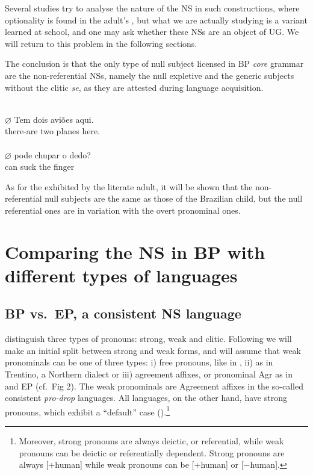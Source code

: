 \documentclass[output=paper]{langsci/langscibook}
\begin{document}
Several studies try to analyse the nature of the NS in such constructions,
where optionality is found in the adult’s , but what we are actually
studying is a variant learned at school, and one may ask whether these NSs are
an object of \gls{UG}. We will return to this problem in the following
sections.

The conclusion is that the only type of null subject licensed in
\gls{BP} \emph{core} grammar are the non-referential
NSs, namely the null expletive and the generic subjects without the clitic
\emph{se}, as they are attested during language acquisition.

\ea%
    \label{ex:26.16}
    \ea \textcite{Simoes2000}\\
    \gll    $\varnothing$\tss{\Expl} Tem dois aviões aqui.\\
            {} there-are two planes here.\\
    \ex \textcite{Magalhaes2007}\\
    \gll    $\varnothing$\tss{\Genc} pode chupar o dedo?\\
            {} can  suck the finger\\
    \z
\z

As for the  exhibited by the literate adult, it will be shown that
the non-referential null subjects are the same as those of the Brazilian child,
but the null referential ones are in variation with the overt pronominal ones.

\section{Comparing the NS in BP with different types of
languages}\label{sec:26.3}

\subsection{BP vs.\ EP, a consistent NS language}\label{sec:26.3.1}

\citet{CarSta1994} distinguish three types of pronouns: strong, weak and
clitic.  Following \citet{Kato1999} we will make an initial split between
strong and weak forms, and will assume that weak pronominals can be one of
three types: i) free pronouns, like in , ii)  as in
Trentino, a Northern  dialect or iii) agreement affixes, or
pronominal Agr as in  and \gls{EP} (cf.\
Fig 2). The weak pronominals are Agreement affixes in the so-called consistent
\emph{pro-drop} languages. All languages, on the other hand, have strong
pronouns, which exhibit a “default” case
(\citealt{Kato2000,Schutze2001}).\footnote{Moreover, strong pronouns are always
    deictic, or referential, while weak pronouns can be deictic or
    referentially dependent.  Strong pronouns are always [+human] while weak
pronouns can be [+human] or [$-$human].}
\end{document}
